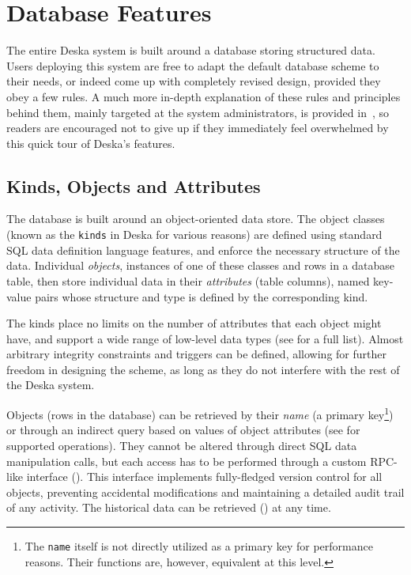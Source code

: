 \documentclass[deska]{subfiles}
\begin{document}
\section{Database Features}

The entire Deska system is built around a database storing structured data.  Users deploying this system are free to
adapt the default database scheme to their needs, or indeed come up with completely revised design, provided they obey a
few rules.  A much more in-depth explanation of these rules and principles behind them, mainly targeted at the system
administrators, is provided in~, so readers are encouraged not to give up if they
immediately feel overwhelmed by this quick tour of Deska's features.

\subsection{Kinds, Objects and Attributes}

The database is built around an object-oriented data store.  The object classes (known as the {\tt kinds} in Deska for
various reasons) are defined using standard SQL data definition language features, and enforce the necessary structure
of the data.  Individual {\em objects}, instances of one of these classes and rows in a database table, then store
individual data in their {\em attributes} (table columns), named key-value pairs whose structure and type is defined by
the corresponding kind.

The kinds place no limits on the number of attributes that each object might have, and support a wide range of low-level
data types (see  for a full list).  Almost arbitrary integrity constraints and
triggers can be defined, allowing for further freedom in designing the scheme, as long as they do not interfere with the
rest of the Deska system.

Objects (rows in the database) can be retrieved by their {\em name} (a primary key\footnote{The {\tt name} itself is not
directly utilized as a primary key for performance reasons.  Their functions are, however, equivalent at this level.})
or through an indirect query based on values of object attributes (see  for supported
operations).  They cannot be altered through direct SQL data manipulation calls, but each access has
to be performed through a custom RPC-like interface ().  This interface
implements fully-fledged version control for all objects, preventing accidental modifications and maintaining a detailed
audit trail of any activity.  The historical data can be retrieved () at any time.
\end{document}
